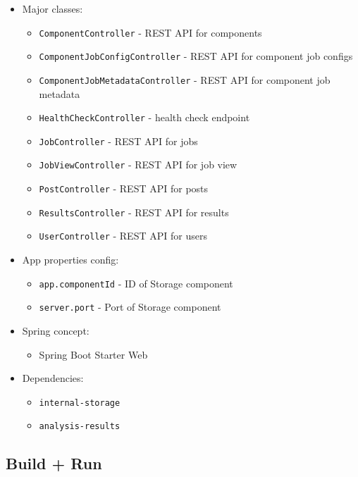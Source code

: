\begin{itemize}
    \item Major classes:
        \begin{itemize}
            \item \texttt{ComponentController} - REST API for components
            \item \texttt{ComponentJobConfigController} - REST API for component job configs
            \item \texttt{ComponentJobMetadataController} - REST API for component job metadata
            \item \texttt{HealthCheckController} - health check endpoint
            \item \texttt{JobController} - REST API for jobs
            \item \texttt{JobViewController} - REST API for job view
            \item \texttt{PostController} - REST API for posts
            \item \texttt{ResultsController} - REST API for results
            \item \texttt{UserController} - REST API for users
        \end{itemize}
    \item App properties config:
        \begin{itemize}
            \item \texttt{app.componentId} - ID of Storage component
            \item \texttt{server.port} - Port of Storage component
        \end{itemize}
    \item Spring concept:
        \begin{itemize}
            \item Spring Boot Starter Web
        \end{itemize}
    \item Dependencies:
        \begin{itemize}
            \item \texttt{internal-storage}
            \item \texttt{analysis-results}
        \end{itemize}
\end{itemize}

\subsection{Build + Run}

